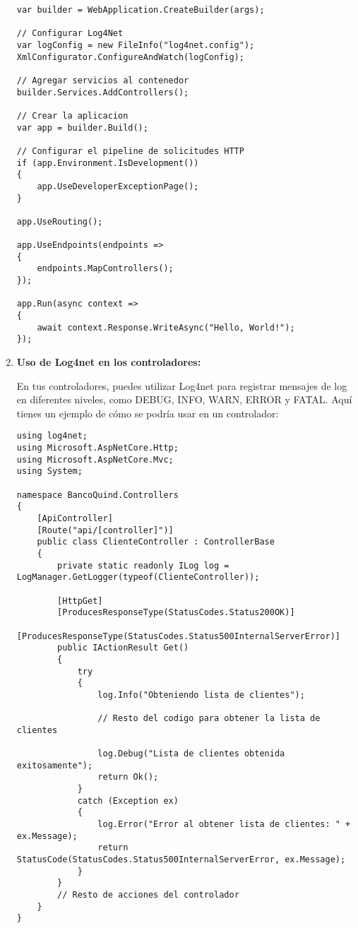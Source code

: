 \documentclass[executivepaper]{article}
\begin{document}
\begin{enumerate}
\begin{lstlisting}
var builder = WebApplication.CreateBuilder(args);

// Configurar Log4Net
var logConfig = new FileInfo("log4net.config");
XmlConfigurator.ConfigureAndWatch(logConfig);

// Agregar servicios al contenedor
builder.Services.AddControllers();

// Crear la aplicacion
var app = builder.Build();

// Configurar el pipeline de solicitudes HTTP
if (app.Environment.IsDevelopment())
{
    app.UseDeveloperExceptionPage();
}

app.UseRouting();

app.UseEndpoints(endpoints =>
{
    endpoints.MapControllers();
});

app.Run(async context =>
{
    await context.Response.WriteAsync("Hello, World!");
});    
\end{lstlisting}
  
  \item \textbf{Uso de Log4net en los controladores:}
  
  En tus controladores, puedes utilizar Log4net para registrar mensajes de log en diferentes niveles, como DEBUG, INFO, WARN, ERROR y FATAL. Aquí tienes un ejemplo de cómo se podría usar en un controlador:
  
\begin{lstlisting}
using log4net;
using Microsoft.AspNetCore.Http;
using Microsoft.AspNetCore.Mvc;
using System;

namespace BancoQuind.Controllers
{
    [ApiController]
    [Route("api/[controller]")]
    public class ClienteController : ControllerBase
    {
        private static readonly ILog log = LogManager.GetLogger(typeof(ClienteController));

        [HttpGet]
        [ProducesResponseType(StatusCodes.Status200OK)]
        [ProducesResponseType(StatusCodes.Status500InternalServerError)]
        public IActionResult Get()
        {
            try
            {
                log.Info("Obteniendo lista de clientes");

                // Resto del codigo para obtener la lista de clientes

                log.Debug("Lista de clientes obtenida exitosamente");
                return Ok();
            }
            catch (Exception ex)
            {
                log.Error("Error al obtener lista de clientes: " + ex.Message);
                return StatusCode(StatusCodes.Status500InternalServerError, ex.Message);
            }
        }
        // Resto de acciones del controlador
    }
}
\end{lstlisting}
\end{enumerate}
\end{document}
